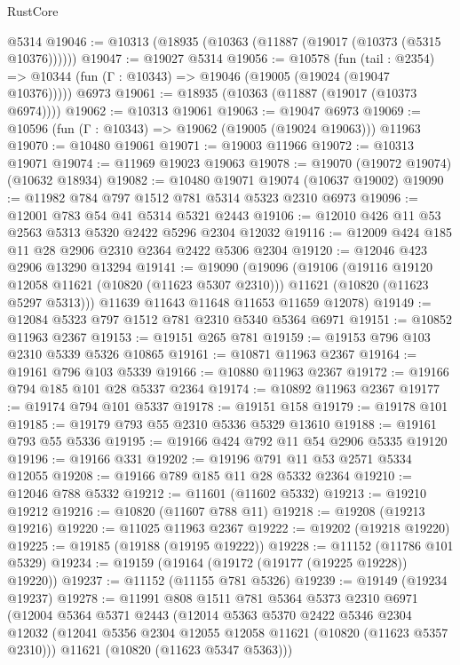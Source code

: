\begin{lexlean}{RustCore}
\begin{coremodule}
    @5314
@19046 := @10313 (@18935 (@10363 (@11887 (@19017 (@10373 (@5315 @10376))))))
@19047 := @19027 @5314
@19056 := @10578
    (fun (tail : @2354) => @10344 (fun (Γ : @10343) => @19046 (@19005 (@19024 (@19047 @10376)))))
    @6973
@19061 := @18935 (@10363 (@11887 (@19017 (@10373 @6974))))
@19062 := @10313 @19061
@19063 := @19047 @6973
@19069 := @10596 (fun (Γ : @10343) => @19062 (@19005 (@19024 @19063))) @11963
@19070 := @10480 @19061
@19071 := @19003 @11966
@19072 := @10313 @19071
@19074 := @11969 @19023 @19063
@19078 := @19070 (@19072 @19074) (@10632 @18934)
@19082 := @10480 @19071 @19074 (@10637 @19002)
@19090 := @11982 @784 @797 @1512 @781 @5314 @5323 @2310 @6973
@19096 := @12001 @783 @54 @41 @5314 @5321 @2443
@19106 := @12010 @426 @11 @53 @2563 @5313 @5320 @2422 @5296 @2304 @12032
@19116 := @12009 @424 @185 @11 @28 @2906 @2310 @2364 @2422 @5306 @2304
@19120 := @12046 @423 @2906 @13290 @13294
@19141 := @19090
    (@19096
      (@19106
        (@19116 @19120 @12058 @11621 (@10820 (@11623 @5307 @2310)))
        @11621
        (@10820 (@11623 @5297 @5313)))
      @11639
      @11643
      @11648
      @11653
      @11659
      @12078)
@19149 := @12084 @5323 @797 @1512 @781 @2310 @5340 @5364 @6971
@19151 := @10852 @11963 @2367
@19153 := @19151 @265 @781
@19159 := @19153 @796 @103 @2310 @5339 @5326 @10865
@19161 := @10871 @11963 @2367
@19164 := @19161 @796 @103 @5339
@19166 := @10880 @11963 @2367
@19172 := @19166 @794 @185 @101 @28 @5337 @2364
@19174 := @10892 @11963 @2367
@19177 := @19174 @794 @101 @5337
@19178 := @19151 @158
@19179 := @19178 @101
@19185 := @19179 @793 @55 @2310 @5336 @5329 @13610
@19188 := @19161 @793 @55 @5336
@19195 := @19166 @424 @792 @11 @54 @2906 @5335 @19120
@19196 := @19166 @331
@19202 := @19196 @791 @11 @53 @2571 @5334 @12055
@19208 := @19166 @789 @185 @11 @28 @5332 @2364
@19210 := @12046 @788 @5332
@19212 := @11601 (@11602 @5332)
@19213 := @19210 @19212
@19216 := @10820 (@11607 @788 @11)
@19218 := @19208 (@19213 @19216)
@19220 := @11025 @11963 @2367
@19222 := @19202 (@19218 @19220)
@19225 := @19185 (@19188 (@19195 @19222))
@19228 := @11152 (@11786 @101 @5329)
@19234 := @19159 (@19164 (@19172 (@19177 (@19225 @19228)) @19220))
@19237 := @11152 (@11155 @781 @5326)
@19239 := @19149 (@19234 @19237)
@19278 := @11991
    @808
    @1511
    @781
    @5364
    @5373
    @2310
    @6971
    (@12004
      @5364
      @5371
      @2443
      (@12014
        @5363
        @5370
        @2422
        @5346
        @2304
        @12032
        (@12041 @5356 @2304 @12055 @12058 @11621 (@10820 (@11623 @5357 @2310)))
        @11621
        (@10820 (@11623 @5347 @5363)))

\end{coremodule}
\end{lexlean}
